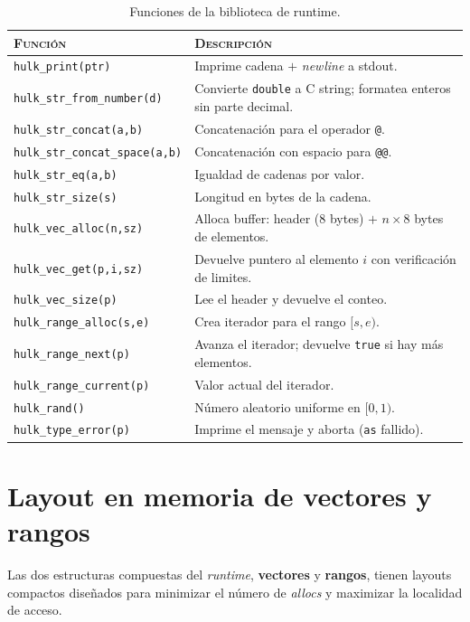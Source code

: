\documentclass[11pt,a4paper,oneside,openany]{report}
\newcommand{\code}[1]{\texttt{#1}}
\begin{document}
\begin{table}[H]
\centering
\caption{Funciones de la biblioteca de runtime.}
\label{tab:runtime}
\begin{tabularx}{\textwidth}{lX}
\toprule
\textsc{Función} & \textsc{Descripción} \\
\midrule
\code{hulk\_print(ptr)}            & Imprime cadena $+$ \textit{newline} a stdout. \\
\code{hulk\_str\_from\_number(d)}  & Convierte \code{double} a C string;
  formatea enteros sin parte decimal. \\
\code{hulk\_str\_concat(a,b)}      & Concatenación para el operador \code{@}. \\
\code{hulk\_str\_concat\_space(a,b)} & Concatenación con espacio para
  \code{@@}. \\
\code{hulk\_str\_eq(a,b)}          & Igualdad de cadenas por valor. \\
\code{hulk\_str\_size(s)}          & Longitud en bytes de la cadena. \\
\code{hulk\_vec\_alloc(n,sz)}      & Alloca buffer: header (8 bytes) $+$ $n \times 8$
  bytes de elementos. \\
\code{hulk\_vec\_get(p,i,sz)}      & Devuelve puntero al elemento $i$ con
  verificación de limites. \\
\code{hulk\_vec\_size(p)}          & Lee el header y devuelve el conteo. \\
\code{hulk\_range\_alloc(s,e)}     & Crea iterador para el rango $[s, e)$. \\
\code{hulk\_range\_next(p)}        & Avanza el iterador; devuelve \code{true} si
  hay más elementos. \\
\code{hulk\_range\_current(p)}     & Valor actual del iterador. \\
\code{hulk\_rand()}                & Número aleatorio uniforme en $[0, 1)$. \\
\code{hulk\_type\_error(p)}        & Imprime el mensaje y aborta (\code{as} fallido). \\
\bottomrule
\end{tabularx}
\end{table}

\section{Layout en memoria de vectores y rangos}

Las dos estructuras compuestas del \textit{runtime}, \textbf{vectores} y
\textbf{rangos}, tienen layouts compactos diseñados para minimizar el número de
\textit{allocs} y maximizar la localidad de acceso.
\end{document}
